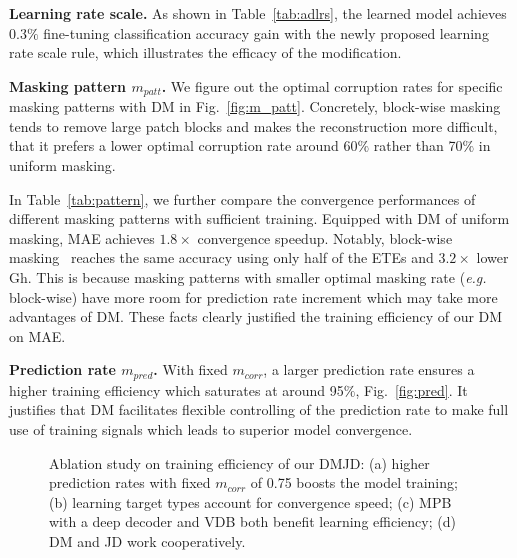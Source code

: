 \documentclass[lettersize,journal]{IEEEtran}
\begin{document}
\textbf{Learning rate scale.}
As shown in Table~\ref{tab:adlrs}, the learned model achieves 0.3$\%$ fine-tuning classification accuracy gain with the newly proposed learning rate scale rule, which illustrates the efficacy of the modification. 

\textbf{Masking pattern $m_{patt}$.}
We figure out the optimal corruption rates for specific masking patterns with DM in Fig.~\ref{fig:m_patt}. Concretely, block-wise masking~\cite{2021arXiv211109886X} tends to remove large patch blocks and makes the reconstruction more difficult, that it prefers a lower optimal corruption rate around 60$\%$ rather than 70$\%$ in uniform masking.

In Table~\ref{tab:pattern}, we further compare the convergence performances of different masking patterns with sufficient training. Equipped with DM of uniform masking, MAE achieves $1.8\times$ convergence speedup.
Notably, block-wise masking~\cite{2021arXiv211109886X} reaches the same accuracy using only half of the ETEs and $3.2\times$ lower Gh. 
This is because masking patterns with smaller optimal masking rate (\textit{e.g.} block-wise) have more room for prediction rate increment which may take more advantages of DM. These facts clearly justified the training efficiency of our DM on MAE.


\textbf{Prediction rate $m_{pred}$.}
With fixed $m_{corr}$, a larger prediction rate ensures a higher training efficiency which saturates at around 95$\%$, Fig.~\ref{fig:pred}. It justifies that DM facilitates flexible controlling of the prediction rate to make full use of training signals which leads to superior model convergence.

\begin{figure*}[!t]
\centering
    \hfill
	\hfill
    \hfill
\caption{Ablation study on training efficiency of our DMJD: (a) higher prediction rates with fixed $m_{corr}$ of 0.75 boosts the model training; (b) learning target types account for convergence speed; (c) MPB with a deep decoder and VDB both benefit learning efficiency; (d) DM and JD work cooperatively.} 
\end{figure*}
\end{document}
